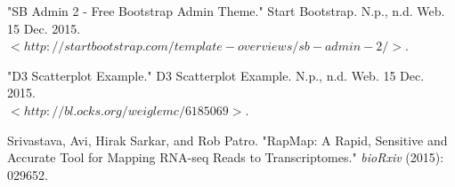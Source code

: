 \documentclass[11pt,letter]{article}
\begin{document}
\begin{thebibliography}{100} %
 "SB Admin 2 - Free Bootstrap Admin Theme." Start Bootstrap. N.p., n.d. Web. 15 Dec. 2015.\\ $<http://startbootstrap.com/template-overviews/sb-admin-2/>$.

"D3 Scatterplot Example." D3 Scatterplot Example. N.p., n.d. Web. 15 Dec. 2015.\\ $<http://bl.ocks.org/weiglemc/6185069>$.

 Srivastava, Avi, Hirak Sarkar, and Rob Patro. "RapMap: A Rapid, Sensitive and Accurate Tool for Mapping RNA-seq Reads to Transcriptomes." \emph{bioRxiv} (2015): 029652.
\end{thebibliography}

% 
\end{document}
